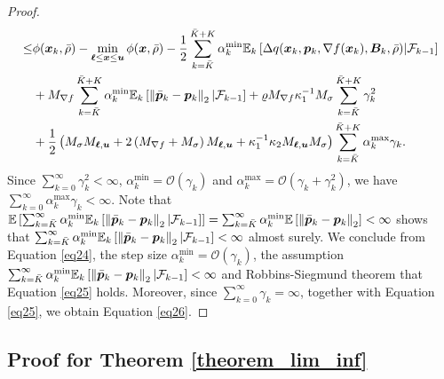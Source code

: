 \documentclass[aos]{imsart}
\numberwithin{equation}{section}
\theoremstyle{plain}
\begin{document}
\begin{appendix}
\begin{proof}
\begin{equation}
\begin{split}
            \leq & \phi(\bm{x}_{k},\Bar{\rho}) - \min_{\bm{\ell} \leq \bm{x} \leq \bm{u}}\phi(\bm{x},\Bar{\rho}) -\frac{1}{2} \sum_{k=\Bar{K}}^{\Bar{K} + K} \alpha_k^{\text{min}} \mathbb{E}_k \left[ \Delta q(\bm{x}_k,\bm{p}_k,\nabla f(\bm{x}_k),\bm{B}_k,\Bar{\rho}) | \mathcal{F}_{k-1} \right] \\
            &  + M_{\nabla f} \sum_{k=\Bar{K}}^{\Bar{K} + K} \alpha_k^{\text{min}} \mathbb{E}_k \left[ \left\|\Bar{\bm{p}}_k - \bm{p}_k \right\|_2 | \mathcal{F}_{k-1} \right] + \varrho M_{\nabla f} \kappa_1^{-1} M_{\sigma} \sum_{k=\Bar{K}}^{\Bar{K} + K} \gamma_k^2 \\
            &  + \frac{1}{2} \left( M_{\sigma} M_{\bm{\ell},\bm{u}} + 2 \left(M_{\nabla f} + M_{\sigma} \right)  M_{\bm{\ell},\bm{u}} + \kappa_1^{-1} \kappa_2 M_{\bm{\ell},\bm{u}} M_{\sigma} \right) \sum_{k=\Bar{K}}^{\Bar{K} + K}  \alpha_k^{\text{max}} \gamma_k.
      \end{split}
    \end{equation} 
    Since $\sum_{k=0}^{\infty} \gamma_k^2 < \infty$, $\alpha_k^{\text{min}} = \mathcal{O}\left( \gamma_k \right)$ and  $\alpha_k^{\text{max}} = \mathcal{O}\left( \gamma_k + \gamma_k^2 \right)$, we have $\sum_{k=0}^{\infty} \alpha_k^{\text{max}} \gamma_k < \infty$. Note that $\mathbb{E} \left[\sum_{k=\Bar{K}}^{\infty} \alpha_k^{\text{min}} \mathbb{E}_k \left[\left\|\Bar{\bm{p}}_k - \bm{p}_k \right\|_2| \mathcal{F}_{k-1} \right]\right] = \sum_{k=\Bar{K}}^{\infty} \alpha_k^{\text{min}} \mathbb{E} \left[\left\|\Bar{\bm{p}}_k - \bm{p}_k \right\|_2\right] < \infty$ shows that $\sum_{k=\Bar{K}}^{\infty} \alpha_k^{\text{min}} \mathbb{E}_k \left[\left\|\Bar{\bm{p}}_k - \bm{p}_k \right\|_2| \mathcal{F}_{k-1} \right] < \infty$ almost surely. We conclude from Equation \eqref{eq24}, the step size $\alpha_k^{\text{min}} = \mathcal{O}\left( \gamma_k \right)$, the assumption $\sum_{k=\Bar{K}}^{\infty} \alpha_k^{\text{min}} \mathbb{E}_k \left[\left\|\Bar{\bm{p}}_k - \bm{p}_k \right\|_2| \mathcal{F}_{k-1} \right] < \infty$ and Robbins-Siegmund theorem \cite{robbins1971convergence} that Equation \eqref{eq25} holds. Moreover, since $\sum_{k=0}^{\infty} \gamma_k = \infty$, together with Equation \eqref{eq25}, we obtain Equation \eqref{eq26}.
\end{proof}


\subsection{Proof for Theorem \ref{theorem_lim_inf}}


\end{appendix}
\end{document}
